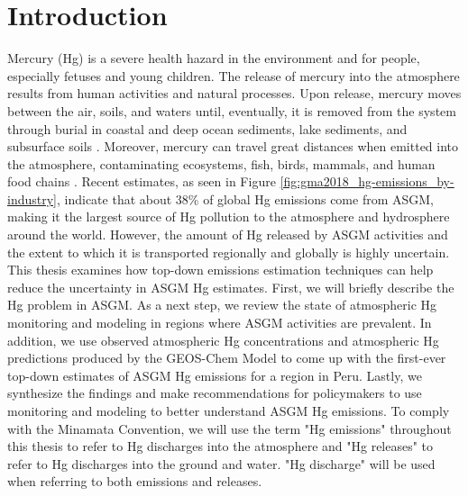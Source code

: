 
\chapter{Introduction}
Mercury (Hg) is a severe health hazard in the environment and for people, especially fetuses and young children\cite{gibb_mercury_2014}. The release of mercury into the atmosphere results from human activities and natural processes. Upon release, mercury moves between the air, soils, and waters until, eventually, it is removed from the system through burial in coastal and deep ocean sediments, lake sediments, and subsurface soils \cite{esdaile_mercury_2018}. Moreover, mercury can travel great distances when emitted into the atmosphere, contaminating ecosystems, fish, birds, mammals, and human food chains \cite{esdaile_mercury_2018}. Recent estimates, as seen in Figure \ref{fig:gma2018_hg-emissions_by-industry},  indicate that about 38\% of global Hg emissions come from ASGM, making it the largest source of Hg pollution to the atmosphere and hydrosphere around the world\cite{united_nations_environment_programme_technical_2019}. However, the amount of Hg released by ASGM activities and the extent to which it is transported regionally and globally is highly uncertain. This thesis examines how top-down emissions estimation techniques can help reduce the uncertainty in ASGM Hg estimates. First, we will briefly describe the Hg problem in ASGM. As a next step, we review the state of atmospheric Hg monitoring and modeling in regions where ASGM activities are prevalent. In addition, we use observed atmospheric Hg concentrations and atmospheric Hg predictions produced by the GEOS-Chem Model to come up with the first-ever top-down estimates of ASGM Hg emissions for a region in Peru. Lastly, we synthesize the findings and make recommendations for policymakers to use monitoring and modeling to better understand ASGM Hg emissions. To comply with the Minamata Convention, we will use the term "Hg emissions" throughout this thesis to refer to Hg discharges into the atmosphere and "Hg releases" to refer to Hg discharges into the ground and water. "Hg discharge" will be used when referring to both emissions and releases.

